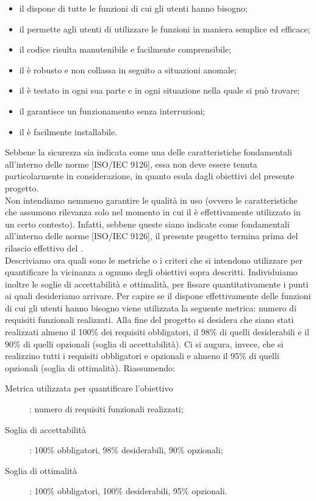 				\begin{itemize}
					\item il  dispone di tutte le funzioni di cui gli utenti hanno bisogno;
					\item il  permette agli utenti di utilizzare le funzioni in maniera semplice ed efficace;
					\item il codice risulta manutenibile e facilmente comprensibile;
					\item il  è robusto e non collassa in seguito a situazioni anomale;
					\item il  è testato in ogni sua parte e in ogni situazione nella quale si può trovare;
					\item il  garantisce un funzionamento senza interruzioni;
					\item il  è facilmente installabile.
				\end{itemize}
				Sebbene la sicurezza sia indicata come una delle caratteristiche fondamentali all'interno delle norme [ISO/IEC 9126], essa non deve essere tenuta particolarmente in considerazione, in quanto esula dagli obiettivi del presente progetto.\\
				Non intendiamo nemmeno garantire le qualità in uso (ovvero le caratteristiche che assumono rilevanza solo nel momento in cui il  è effettivamente utilizzato in un certo contesto). Infatti, sebbene queste siano indicate come fondamentali all'interno delle norme [ISO/IEC 9126], il presente progetto termina prima del rilascio effettivo del .\\
				Descriviamo ora quali sono le metriche o i criteri che si intendono utilizzare per quantificare la vicinanza a ognuno degli obiettivi sopra descritti. Individuiamo inoltre le soglie di accettabilità e ottimalità, per fissare quantitativamente i punti ai quali desideriamo arrivare.
					Per capire se il  dispone effettivamente delle funzioni di cui gli utenti hanno bisogno viene utilizzata la seguente metrica: numero di requisiti funzionali realizzati. Alla fine del progetto si desidera che siano stati realizzati almeno il 100\% dei requisiti obbligatori, il 98\% di quelli desiderabili e il 90\% di quelli opzionali (soglia di accettabilità). Ci si augura, invece, che si realizzino tutti i requisiti obbligatori e opzionali e almeno il 95\% di quelli opzionali (soglia di ottimalità). Riassumendo:
					\begin{description}
						\item[Metrica utilizzata per quantificare l'obiettivo]: numero di requisiti funzionali realizzati;
						\item[Soglia di accettabilità]: 100\% obbligatori, 98\% desiderabili, 90\% opzionali;
						\item[Soglia di ottimalità]: 100\% obbligatori, 100\% desiderabili, 95\% opzionali.
					\end{description}
